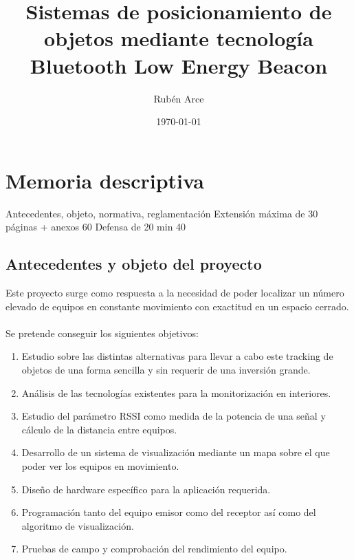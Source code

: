 \documentclass[a4paper ,12pt, onecolumn]{article}
\begin{document}
\title{Sistemas de posicionamiento de objetos mediante tecnología Bluetooth Low Energy Beacon }
\author{Rubén Arce}
\date{\today}
\maketitle
\cleardoublepage
\tableofcontents
\cleardoublepage
\section{Memoria descriptiva}
Antecedentes, objeto, normativa, reglamentación
Extensión máxima de 30 páginas + anexos 60
Defensa de 20 min  40
    \subsection{Antecedentes y objeto del proyecto}
        Este proyecto surge como respuesta a la necesidad de poder localizar un número elevado de equipos en 
        constante movimiento con exactitud en un espacio cerrado.
        \paragraph{}
        Se pretende conseguir los siguientes objetivos:
        \begin{enumerate}
            \item Estudio sobre las distintas alternativas para llevar a cabo este tracking de objetos de una forma
            sencilla y sin requerir de una inversión grande.
            \item Análisis de las tecnologías existentes para la monitorización en interiores.
            \item Estudio del parámetro RSSI como medida de la potencia de una señal y cálculo de la distancia entre equipos.
            \item Desarrollo de un sistema de visualización mediante un mapa sobre el que poder ver los equipos en movimiento.
            \item Diseño de hardware específico para la aplicación requerida.
            \item Programación tanto del equipo emisor como del receptor así como del algoritmo de visualización.
            \item Pruebas de campo y comprobación del rendimiento del equipo.
        \end{enumerate}
\end{document}
